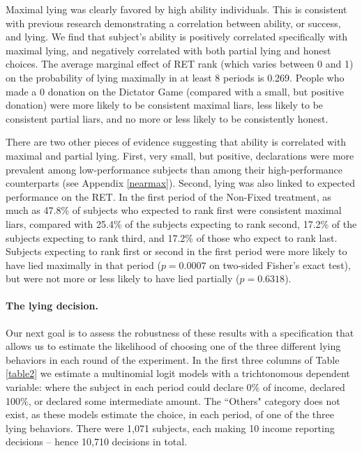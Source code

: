 \documentclass[12pt]{article}
\begin{document}
\par Maximal lying was clearly favored by high ability individuals.  This is consistent with previous research \citep{Schurretal2016,Vincentetal2015,DuchSolaz2017} demonstrating a correlation between ability, or success, and lying. We find that subject's ability is positively correlated specifically with maximal lying, and negatively correlated with both partial lying and honest choices. The average marginal effect of RET rank (which varies between 0 and 1) on the probability of lying maximally in at least 8 periods is 0.269.  People who made a 0 donation on the Dictator Game (compared with a small, but positive donation) were more likely to be consistent maximal liars, less likely to be consistent partial liars, and no more or less likely to be consistently honest. 

\par There are two other pieces of evidence suggesting that ability is correlated with maximal and partial lying. First, very small, but positive, declarations were more prevalent among low-performance subjects than among their high-performance counterparts (see Appendix \ref{nearmax}).  Second, lying was also linked to expected performance on the RET. In the first period of the Non-Fixed treatment, as much as 47.8\% of subjects who expected to rank first were consistent maximal liars, compared with 25.4\% of the subjects expecting to rank second, 17.2\% of the subjects expecting to rank third, and 17.2\% of those who expect to rank last.\footnotemark{} 
Subjects expecting to rank first or second in the first period were more likely to have lied maximally in that period ($p=0.0007$ on two-sided Fisher's exact test), but were not more or less likely to have lied partially ($p=0.6318$).\footnotemark{}
\label{stata:init_pred}

\paragraph{The lying decision.} Our next goal is to assess the robustness of these results with a specification that allows us to estimate the likelihood of choosing one of the three different lying behaviors in each round of the experiment. In the first three columns of Table \ref{table2} we estimate a multinomial logit models with a trichtonomous dependent variable: where the subject in each period could declare 0\% of income, declared 100\%, or declared some intermediate amount. The ``Others" category does not exist, as these models estimate the choice, in each period, of one of the three lying behaviors. There were 1,071 subjects, each making 10 income reporting decisions -- hence 10,710 decisions in total.
\end{document}
